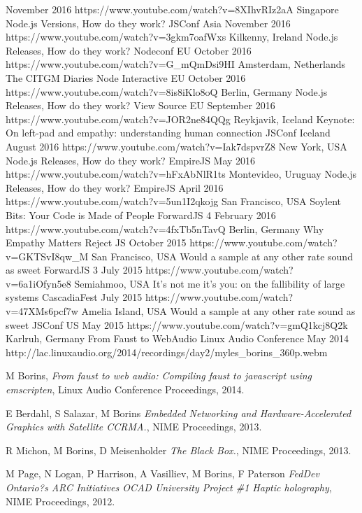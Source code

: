 \documentclass[10pt,a4paper,sans]{moderncv}   %
\begin{document}
   {November 2016}{}
   {https://www.youtube.com/watch?v=8XIhvRIz2aA}
 \cventry
   {Singapore}
   {Node.js Versions, How do they work?}
   {JSConf Asia}
   {November 2016}{}
   {https://www.youtube.com/watch?v=3gkm7oafWxs}
 \cventry
   {Kilkenny, Ireland}
   {Node.js Releases, How do they work?}
   {Nodeconf EU}
   {October 2016}{}
   {https://www.youtube.com/watch?v=G\_mQmDsi9HI}
 \cventry
   {Amsterdam, Netherlands}
   {The CITGM Diaries}
   {Node Interactive EU}
   {October 2016}{}
   {https://www.youtube.com/watch?v=8is8iKlo8oQ}
 \cventry
   {Berlin, Germany}
   {Node.js Releases, How do they work?}
   {View Source EU}
   {September 2016}{}
   {https://www.youtube.com/watch?v=JOR2ne84QQg}
 \cventry
   {Reykjavik, Iceland}
   {Keynote:  On left-pad and empathy: understanding human connection}
   {JSConf Iceland}
   {August 2016}{}
   {https://www.youtube.com/watch?v=Iak7dspvrZ8}
 \cventry
   {New York, USA}
   {Node.js Releases, How do they work?}
   {EmpireJS}
   {May 2016}{}
   {https://www.youtube.com/watch?v=hFxAbNlR1ts}
 \cventry
   {Montevideo, Uruguay}
   {Node.js Releases, How do they work?}
   {EmpireJS}
   {April 2016}{}
   {https://www.youtube.com/watch?v=5un1I2qkojg}
 \cventry
   {San Francisco, USA}
   {Soylent Bits: Your Code is Made of People}
   {ForwardJS 4}
   {February 2016}{}
   {https://www.youtube.com/watch?v=4fxTb5nTavQ}
 \cventry
   {Berlin, Germany}
   {Why Empathy Matters}
   {Reject JS}
   {October 2015}{}
   {https://www.youtube.com/watch?v=GKTSvI8qw\_M}
 \cventry
   {San Francisco, USA}
   {Would a sample at any other rate sound as sweet}
   {ForwardJS 3}
   {July 2015}{}
   {https://www.youtube.com/watch?v=6a1iOfyn5e8}
 \cventry
   {Semiahmoo, USA}
   {It's not me it's you: on the fallibility of large systems}
   {CascadiaFest}
   {July 2015}{}
   {https://www.youtube.com/watch?v=47XMs6pcf7w}
 \cventry
   {Amelia Island, USA}
   {Would a sample at any other rate sound as sweet}
   {JSConf US}
   {May 2015}{}
   {https://www.youtube.com/watch?v=gmQ1kcj8Q2k}
 \cventry
   {Karlruh, Germany}
   {From Faust to WebAudio}
   {Linux Audio Conference}
   {May 2014}{}
   {http://lac.linuxaudio.org/2014/recordings/day2/myles\_borins\_360p.webm}

 \begin{thebibliography}{9}

   M Borins,
   \textit{From faust to web audio: Compiling faust to javascript using emscripten},
   Linux Audio Conference Proceedings,
   2014.

   E Berdahl, S Salazar, M Borins
   \textit{Embedded Networking and Hardware-Accelerated Graphics with Satellite CCRMA.},
   NIME Proceedings,
   2013.

   R Michon, M Borins, D Meisenholder
   \textit{The Black Box.},
   NIME Proceedings,
   2013.

   M Page, N Logan, P Harrison, A Vasilliev, M Borins, F Paterson
   \textit{FedDev Ontario?s ARC Initiatives OCAD University Project \#1 Haptic holography},
   NIME Proceedings,
   2012.

 \end{thebibliography}
\end{document}
